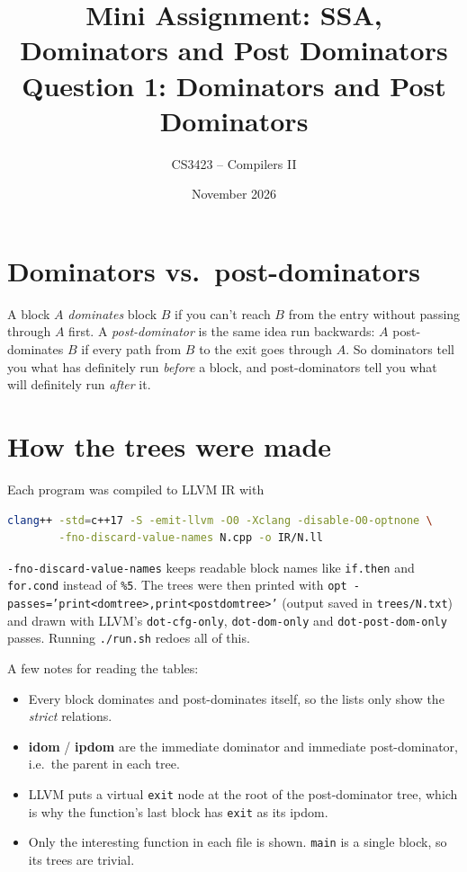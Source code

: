 \documentclass[11pt,a4paper]{article}
\title{\textbf{Mini Assignment: SSA, Dominators and Post Dominators}\\
\large Question 1: Dominators and Post Dominators}
\author{CS3423 -- Compilers II}
\date{November 2026}
\begin{document}
\maketitle

\section{Dominators vs.\ post-dominators}

A block $A$ \emph{dominates} block $B$ if you can't reach $B$ from the
entry without passing through $A$ first. A \emph{post-dominator} is the
same idea run backwards: $A$ post-dominates $B$ if every path from $B$
to the exit goes through $A$. So dominators tell you what has definitely
run \emph{before} a block, and post-dominators tell you what will
definitely run \emph{after} it.

\section{How the trees were made}

Each program was compiled to LLVM IR with
\begin{lstlisting}[language=bash]
clang++ -std=c++17 -S -emit-llvm -O0 -Xclang -disable-O0-optnone \
        -fno-discard-value-names N.cpp -o IR/N.ll
\end{lstlisting}
\texttt{-fno-discard-value-names} keeps readable block names like
\texttt{if.then} and \texttt{for.cond} instead of \texttt{\%5}. The trees
were then printed with
\texttt{opt -passes='print<domtree>,print<postdomtree>'}
(output saved in \texttt{trees/N.txt}) and drawn with LLVM's
\texttt{dot-cfg-only}, \texttt{dot-dom-only} and \texttt{dot-post-dom-only}
passes. Running \texttt{./run.sh} redoes all of this.

A few notes for reading the tables:
\begin{itemize}
  \item Every block dominates and post-dominates itself, so the lists only
        show the \emph{strict} relations.
  \item \textbf{idom} / \textbf{ipdom} are the immediate dominator and
        immediate post-dominator, i.e.\ the parent in each tree.
  \item LLVM puts a virtual \texttt{exit} node at the root of the
        post-dominator tree, which is why the function's last block has
        \texttt{exit} as its ipdom.
  \item Only the interesting function in each file is shown. \texttt{main}
        is a single block, so its trees are trivial.
\end{itemize}
\end{document}
